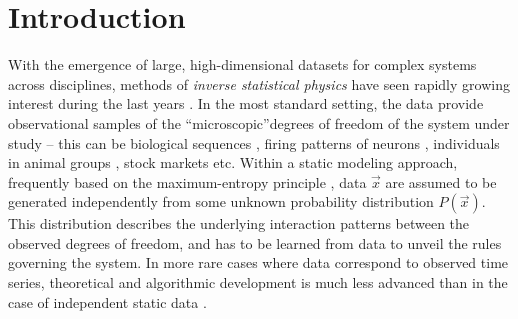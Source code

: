 \documentclass[preprint,amsmath,amssymb,superscriptaddress,showpacs,pre]{revtex4-1}
\begin{document}
\maketitle


\section{Introduction}
\label{sec:int}

With the emergence of large, high-dimensional datasets for complex systems across disciplines, methods of {\it inverse statistical physics} have seen rapidly growing interest during the last years \cite{Inverse_problem_Berg}. In the most standard setting, the data provide observational samples of the ``microscopic''degrees of freedom of the system under study -- this can be biological sequences \cite{levy_potts_2017,cocco_inverse_2018}, firing patterns of neurons \cite{schneidman2006weak,roudi2009ising}, individuals in animal groups \cite{bialek2012statistical,cavagna2018physics}, stock markets \cite{bury2013market,borysov2015us} etc.
Within a static modeling approach, frequently based on the maximum-entropy principle \cite{jaynes1957information}, data $\vec x$ are assumed to be generated independently from some unknown probability distribution $P(\vec x)$. This distribution describes the underlying interaction patterns between the observed degrees of freedom, and has to be learned from data to unveil the rules governing the system. 
In more rare cases where data correspond to observed time series, theoretical and algorithmic development is much less advanced than in the case of independent static data \cite{Inverse_problem_Berg}.
\end{document}
